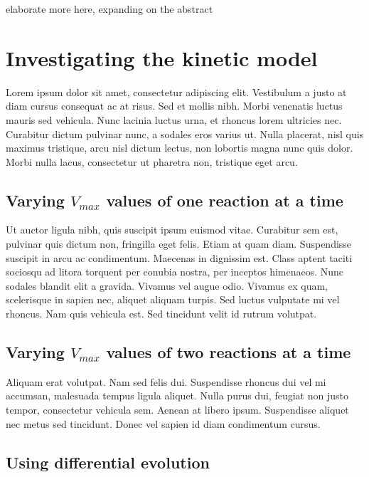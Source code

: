 \documentclass[parskip=full]{scrreprt}
\begin{document}
elaborate more here, expanding on the abstract

\chapter{Investigating the kinetic model}
\label{ch:kinetic}

Lorem ipsum dolor sit amet, consectetur adipiscing elit. Vestibulum a justo at diam cursus consequat ac at risus. Sed et mollis nibh. Morbi venenatis luctus mauris sed vehicula. Nunc lacinia luctus urna, et rhoncus lorem ultricies nec. Curabitur dictum pulvinar nunc, a sodales eros varius ut. Nulla placerat, nisl quis maximus tristique, arcu nisl dictum lectus, non lobortis magna nunc quis dolor. Morbi nulla lacus, consectetur ut pharetra non, tristique eget arcu.

\section{Varying $V_{max}$ values of one reaction at a time}
\label{sec:onereac}

Ut auctor ligula nibh, quis suscipit ipsum euismod vitae. Curabitur sem est, pulvinar quis dictum non, fringilla eget felis. Etiam at quam diam. Suspendisse suscipit in arcu ac condimentum. Maecenas in dignissim est. Class aptent taciti sociosqu ad litora torquent per conubia nostra, per inceptos himenaeos. Nunc sodales blandit elit a gravida. Vivamus vel augue odio. Vivamus ex quam, scelerisque in sapien nec, aliquet aliquam turpis. Sed luctus vulputate mi vel rhoncus. Nam quis vehicula est. Sed tincidunt velit id rutrum volutpat.

\section{Varying $V_{max}$ values of two reactions at a time}
\label{sec:couples}

Aliquam erat volutpat. Nam sed felis dui. Suspendisse rhoncus dui vel mi accumsan, malesuada tempus ligula aliquet. Nulla purus dui, feugiat non justo tempor, consectetur vehicula sem. Aenean at libero ipsum. Suspendisse aliquet nec metus sed tincidunt. Donec vel sapien id diam condimentum cursus.

\section{Using differential evolution}
\label{sec:de}
\end{document}
